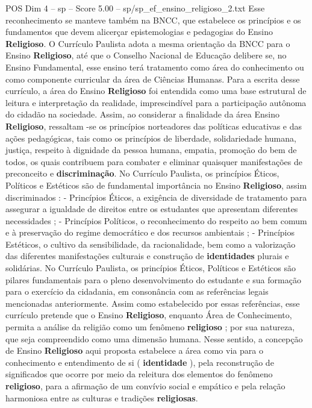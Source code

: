 \begin{textsample}{POS Dim 4 – sp – Score 5.00 – sp/sp\_ef\_ensino\_religioso\_2.txt}
Esse reconhecimento se manteve também na BNCC, que estabelece os princípios e os fundamentos que devem alicerçar epistemologias e pedagogias do Ensino \textbf{Religioso}.
O Currículo Paulista adota a mesma orientação da BNCC para o Ensino \textbf{Religioso}, até que o Conselho Nacional de Educação delibere se, no Ensino Fundamental, esse ensino terá tratamento como área do conhecimento ou como componente curricular da área de Ciências Humanas.
Para a escrita desse currículo, a área do Ensino \textbf{Religioso} foi entendida como uma base estrutural de leitura e interpretação da realidade, imprescindível para a participação autônoma do cidadão na sociedade.
Assim, ao considerar a finalidade da área Ensino \textbf{Religioso}, ressaltam -se os princípios norteadores das políticas educativas e das ações pedagógicas, tais como os princípios de liberdade, solidariedade humana, justiça, respeito à dignidade da pessoa humana, empatia, promoção do bem de todos, os quais contribuem para combater e eliminar quaisquer manifestações de preconceito e \textbf{discriminação}.
No Currículo Paulista, os princípios Éticos, Políticos e Estéticos são de fundamental importância no Ensino \textbf{Religioso}, assim discriminados : - Princípios Éticos, a exigência de diversidade de tratamento para assegurar a igualdade de direitos entre os estudantes que apresentam diferentes necessidades ; - Princípios Políticos, o reconhecimento do respeito ao bem comum e à preservação do regime democrático e dos recursos ambientais ; - Princípios Estéticos, o cultivo da sensibilidade, da racionalidade, bem como a valorização das diferentes manifestações culturais e construção de \textbf{identidades} plurais e solidárias.
No Currículo Paulista, os princípios Éticos, Políticos e Estéticos são pilares fundamentais para o pleno desenvolvimento do estudante e sua formação para o exercício da cidadania, em consonância com as referências legais mencionadas anteriormente.
Assim como estabelecido por essas referências, esse currículo pretende que o Ensino \textbf{Religioso}, enquanto Área de Conhecimento, permita a análise da religião como um fenômeno \textbf{religioso} ; por sua natureza, que seja compreendido como uma dimensão humana.
Nesse sentido, a concepção de Ensino \textbf{Religioso} aqui proposta estabelece a área como via para o conhecimento e entendimento de si ( \textbf{identidade} ), pela reconstrução de significados que ocorre por meio da releitura dos elementos do fenômeno \textbf{religioso}, para a afirmação de um convívio social e empático e pela relação harmoniosa entre as culturas e tradições \textbf{religiosas}.

\end{textsample}
